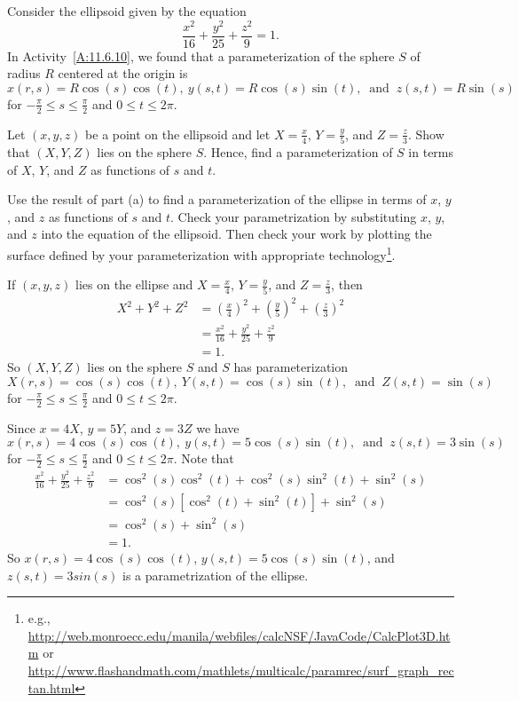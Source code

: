 \begin{exercises} 

\item Consider the ellipsoid given by the equation 
$$\frac{x^2}{16} + \frac{y^2}{25} + \frac{z^2}{9} = 1.$$
In Activity~\ref{A:11.6.10}, we found that a parameterization of the sphere $S$ of radius $R$ centered at the origin is 
\[x(r,s) = R\cos(s) \cos(t), \ y(s,t) = R \cos(s) \sin(t), \ \text{ and } \ z(s,t) = R\sin(s)\]
for $-\frac{\pi}{2} \leq s \leq \frac{\pi}{2}$ and $0 \leq t \leq 2\pi$.
	
\ba
	\item Let $(x,y,z)$ be a point on the ellipsoid and let $X = \frac{x}{4}$, $Y = \frac{y}{5}$, and $Z = \frac{z}{3}$. Show that $(X,Y,Z)$ lies on the sphere $S$. Hence, find a parameterization of $S$ in terms of $X$, $Y$, and $Z$ as functions of $s$ and $t$. 
	\item Use the result of part (a) to find a parameterization of the ellipse in terms of $x$, $y$, and $z$ as functions of $s$ and $t$. Check your parametrization by substituting $x$, $y$, and $z$ into the equation of the ellipsoid. Then check your work by plotting the surface defined by your parameterization with
    appropriate technology\footnote{e.g.,
    \url{http://web.monroecc.edu/manila/webfiles/calcNSF/JavaCode/CalcPlot3D.htm}
    or
    \url{http://www.flashandmath.com/mathlets/multicalc/paramrec/surf_graph_rectan.html}}.
\ea

\begin{exerciseSolution}
\ba
	\item If $(x,y,z)$ lies on the ellipse and $X = \frac{x}{4}$, $Y = \frac{y}{5}$, and $Z = \frac{z}{3}$, then 
\begin{align*}
X^2+Y^2+Z^2 &= \left(\frac{x}{4}\right)^2 + \left(\frac{y}{5}\right)^2 + \left(\frac{z}{3}\right)^2 \\
	&= \frac{x^2}{16} + \frac{y^2}{25} + \frac{z^2}{9} \\
	&= 1.
\end{align*}
So $(X,Y,Z)$ lies on the sphere $S$ and $S$ has parameterization 
\[X(r,s) = \cos(s) \cos(t), \ Y(s,t) = \cos(s) \sin(t), \ \text{ and } \ Z(s,t) = \sin(s)\]
for $-\frac{\pi}{2} \leq s \leq \frac{\pi}{2}$ and $0 \leq t \leq 2\pi$.
	\item Since $x = 4X$, $y = 5Y$, and $z = 3Z$ we have 
\[x(r,s) = 4\cos(s) \cos(t), \ y(s,t) = 5\cos(s) \sin(t), \ \text{ and } \ z(s,t) = 3\sin(s)\]
for $-\frac{\pi}{2} \leq s \leq \frac{\pi}{2}$ and $0 \leq t \leq 2\pi$. Note that 
\begin{align*}
\frac{x^2}{16} + \frac{y^2}{25} + \frac{z^2}{9} &= \cos^2(s)\cos^2(t) + \cos^2(s) \sin^2(t)  + \sin^2(s) \\
	&= \cos^2(s)[\cos^2(t) + \sin^2(t)] + \sin^2(s) \\
	&= \cos^2(s) + \sin^2(s) \\
	&= 1.
\end{align*}
So $x(r,s) = 4\cos(s) \cos(t)$, $y(s,t) = 5\cos(s) \sin(t)$, and $z(s,t) = 3sin(s)$ is a parametrization of the ellipse. 
\ea
\end{exerciseSolution}


\end{exercises}
